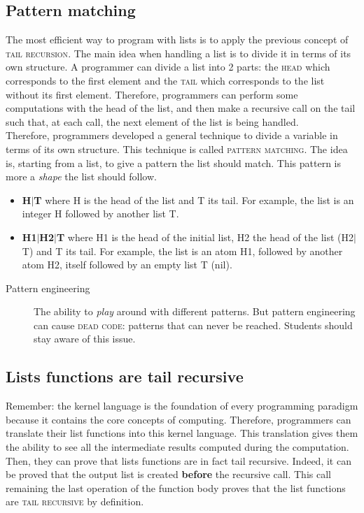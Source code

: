 \documentclass[11pt,a4paper,twoside,openright]{report}
\begin{document}
\subsection{Pattern matching}
The most efficient way to program with lists is to apply the previous concept 
of \textsc{tail recursion}. The main idea when handling a list is to divide it 
in terms of its own structure. A programmer can divide a list into 2 parts: the 
\textsc{head} which corresponds to the first element and the \textsc{tail} 
which 
corresponds to the list without its first element. Therefore, programmers can 
perform some computations with the head of the list, and then make a recursive 
call on the tail such that, at each call, the next element of the list is being 
handled.\\

Therefore, programmers developed a general technique to divide a variable in 
terms of its own structure. This technique is called \textsc{pattern matching}. 
The idea is, starting from a list, to give a pattern the list should match. 
This 
pattern is more a \textit{shape} the list should follow.

\begin{itemize}
	\item \textbf{H$|$T} where H is the head of the list and T its tail. 
For example, the list is an integer H followed by another list T.
	\item \textbf{H1$|$H2$|$T} where H1 is the head of the initial list, H2 
the head of the list (H2$|$T) and T its tail. For example, the list is an atom 
H1, followed by another atom H2, itself followed by an empty list T (nil).
\end{itemize}

\begin{description}
 \item[Pattern engineering] The ability to \textit{play} around with different 
patterns. But pattern engineering can cause \textsc{dead code}: patterns that 
can never be reached. Students should stay aware of this issue.
\end{description}

\subsection{Lists functions are tail recursive}

Remember: the kernel language is the foundation of every programming paradigm 
because it contains the core concepts of computing. Therefore, programmers can 
translate their list functions into this kernel language. This translation 
gives 
them the ability to see all the intermediate results computed during the 
computation. Then, they can prove that lists functions are in fact tail 
recursive. Indeed, it can be proved that the output list is created \textbf{before} 
the recursive call. This call remaining the last operation of the function body 
proves that the list functions are \textsc{tail recursive} by definition.\\
\end{document}
